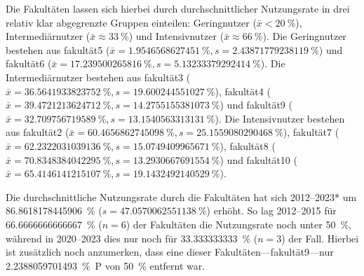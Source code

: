 Die Fakultäten lassen sich hierbei durch durchschnittlicher Nutzungsrate in drei relativ klar abgegrenzte Gruppen einteilen: Geringnutzer ($\bar{x}<\SI[round-mode=places,round-precision=2]{20}{\percent}$), Intermediärnutzer ($\bar{x}\approx\SI[round-mode=places,round-precision=2]{33}{\percent}$) und Intensivnutzer ($\bar{x}\approx\SI[round-mode=places,round-precision=2]{66}{\percent}$).
Die Geringnutzer bestehen aus \gls{fakultät5} ($\bar{x}=\SI[round-mode=places,round-precision=2]{1.9546568627451}{\percent},s=\SI[round-mode=places,round-precision=2]{2.43871779238119}{\percent}$) und \gls{fakultät6} ($\bar{x}=\SI[round-mode=places,round-precision=2]{17.239500265816}{\percent},s=\SI[round-mode=places,round-precision=2]{5.13233379292414}{\percent}$).
Die Intermediärnutzer bestehen aus \gls{fakultät3} ($\bar{x}=\SI[round-mode=places,round-precision=2]{36.5641933823752}{\percent},s=\SI[round-mode=places,round-precision=2]{19.600244551027}{\percent}$), \gls{fakultät4} ($\bar{x}=\SI[round-mode=places,round-precision=2]{39.4721213624712}{\percent},s=\SI[round-mode=places,round-precision=2]{14.2755155381073}{\percent}$) und \gls{fakultät9} ($\bar{x}=\SI[round-mode=places,round-precision=2]{32.709756719589}{\percent},s=\SI[round-mode=places,round-precision=2]{13.1540563313131}{\percent}$).
Die Intensivnutzer bestehen aus \gls{fakultät2} ($\bar{x}=\SI[round-mode=places,round-precision=2]{60.4656862745098}{\percent},s=\SI[round-mode=places,round-precision=2]{25.1559080290468}{\percent}$), \gls{fakultät7} ($\bar{x}=\SI[round-mode=places,round-precision=2]{62.2322031039136}{\percent},s=\SI[round-mode=places,round-precision=2]{15.0749409965671}{\percent}$), \gls{fakultät8} ($\bar{x}=\SI[round-mode=places,round-precision=2]{70.8348384042295}{\percent},s=\SI[round-mode=places,round-precision=2]{13.2930667691554}{\percent}$) und \gls{fakultät10} ($\bar{x}=\SI[round-mode=places,round-precision=2]{65.4146141215107}{\percent},s=\SI[round-mode=places,round-precision=2]{19.1432492140529}{\percent}$).

Die durchschnittliche Nutzungsrate durch die Fakultäten hat sich 2012--2023* um \SI[round-mode=places,round-precision=2]{86.8618178445906}{\percent} ($s=\SI[round-mode=places,round-precision=2]{47.0570062551138}{\percent}$) erhöht.
So lag 2012--2015 für \SI[round-mode=places,round-precision=2]{66,6666666666667}{\percent} ($n=\num{6}$) der Fakultäten die Nutzungsrate noch unter \SI[round-mode=places,round-precision=2]{50}{\percent}, während in 2020--2023 dies nur noch für \SI[round-mode=places,round-precision=2]{33,333333333}{\percent} ($n=\num{3}$) der Fall.
Hierbei ist zusätzlich noch anzumerken, dass eine dieser Fakultäten---\gls{fakultät9}---nur \SI[round-mode=places,round-precision=2]{2.2388059701493}{\percent P} von \SI[round-mode=places,round-precision=2]{50}{\percent} entfernt war.


